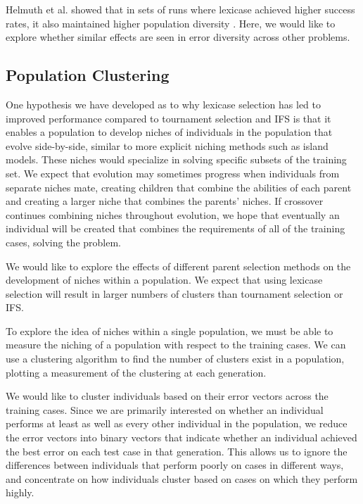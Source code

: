 Helmuth et al. showed that in sets of runs where lexicase achieved higher success rates, it also maintained higher population diversity \cite{Helmuth:2015:ieeeTEC}. Here, we would like to explore whether similar effects are seen in error diversity across other problems.


\subsection{Population Clustering}

One hypothesis we have developed as to why lexicase selection has led to improved performance compared to tournament selection and IFS is that it enables a population to develop niches of individuals in the population that evolve side-by-side, similar to more explicit niching methods such as island models. These niches would specialize in solving specific subsets of the training set. We expect that evolution may sometimes progress when individuals from separate niches mate, creating children that combine the abilities of each parent and creating a larger niche that combines the parents' niches. If crossover continues combining niches throughout evolution, we hope that eventually an individual will be created that combines the requirements of all of the training cases, solving the problem.

We would like to explore the effects of different parent selection methods on the development of niches within a population. We expect that using lexicase selection will result in larger numbers of clusters than tournament selection or IFS.

To explore the idea of niches within a single population, we must be able to measure the niching of a population with respect to the training cases. We can use a clustering algorithm to find the number of clusters exist in a population, plotting a measurement of the clustering at each generation.

We would like to cluster individuals based on their error vectors across the training cases. Since we are primarily interested on whether an individual performs at least as well as every other individual in the population, we reduce the error vectors into binary vectors that indicate whether an individual achieved the best error on each test case in that generation. This allows us to ignore the differences between individuals that perform poorly on cases in different ways, and concentrate on how individuals cluster based on cases on which they perform highly.

